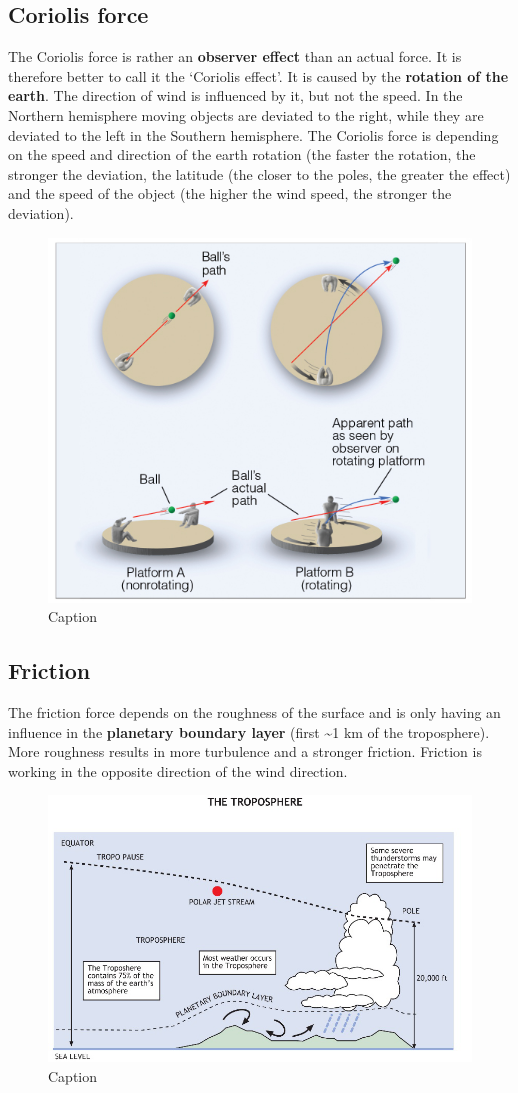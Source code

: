 \documentclass[oneside]{book}
\begin{document}
\subsection{Coriolis force}\label{coriolis-force}

The Coriolis force is rather an \textbf{observer effect} than an actual
force. It is therefore better to call it the `Coriolis effect'. It is
caused by the \textbf{rotation of the earth}. The direction of wind is
influenced by it, but not the speed. In the Northern hemisphere moving
objects are deviated to the right, while they are deviated to the left
in the Southern hemisphere. The Coriolis force is depending on the speed
and direction of the earth rotation (the faster the rotation, the
stronger the deviation, the latitude (the closer to the poles, the
greater the effect) and the speed of the object (the higher the wind
speed, the stronger the deviation).

\begin{figure}

{\centering \includegraphics[width=0.4\linewidth]{figures/Figure46} 

}

\caption{Caption}\label{fig:Coriolis}
\end{figure}

\subsection{Friction}\label{friction}

The friction force depends on the roughness of the surface and is only
having an influence in the \textbf{planetary boundary layer} (first
\textasciitilde{}1 km of the troposphere). More roughness results in
more turbulence and a stronger friction. Friction is working in the
opposite direction of the wind direction.

\begin{figure}

{\centering \includegraphics[width=0.4\linewidth]{figures/Figure47} 

}

\caption{Caption}\label{fig:Friction}
\end{figure}
\end{document}
